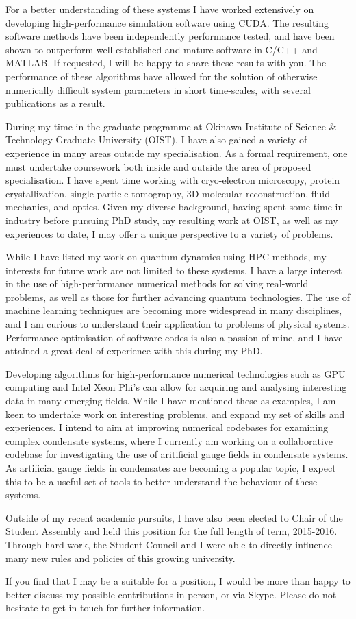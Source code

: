 \documentclass[12pt,a4paper,unicode]{moderncv}
\begin{document}
{    For a better understanding of these systems I have worked extensively on developing high-performance simulation software using CUDA. The resulting software methods have been independently performance tested, and have been shown to outperform well-established and mature software in C/C++ and \textsc{MATLAB}. If requested, I will be happy to share these results with you. The performance of these algorithms have allowed for the solution of otherwise numerically difficult system parameters in short time-scales, with several publications as a result.

    During my time in the graduate programme at Okinawa Institute of Science \& Technology Graduate University (OIST), I have also gained a variety of experience in many areas outside my specialisation. As a formal requirement, one must undertake coursework both inside and outside the area of proposed specialisation. I have spent time working with cryo-electron microscopy, protein crystallization, single particle tomography, 3D molecular reconstruction, fluid mechanics, and optics. Given my diverse background, having spent some time in industry before pursuing PhD study, my resulting work at OIST, as well as my experiences to date, I may offer a unique perspective to a variety of problems.

    While I have listed my work on quantum dynamics using HPC methods, my interests for future work are not limited to these systems. I have a large interest in the use of high-performance numerical methods for solving real-world problems, as well as those for further advancing quantum technologies. The use of machine learning techniques are becoming more widespread in many disciplines, and I am curious to understand their application to problems of physical systems. Performance optimisation of software codes is also a passion of mine, and I have attained a great deal of experience with this during my PhD.

    Developing algorithms for high-performance numerical technologies such as GPU computing and Intel Xeon Phi's can allow for acquiring and analysing interesting data in many emerging fields. While I have mentioned these as examples, I am keen to undertake work on interesting problems, and expand my set of skills and experiences. I intend to aim at improving numerical codebases for examining complex condensate systems, where I currently am working on a collaborative codebase for investigating the use of aritificial gauge fields in condensate systems. As artificial gauge fields in condensates are becoming a popular topic, I expect this to be a useful set of tools to better understand the behaviour of these systems.

    Outside of my recent academic pursuits, I have also been elected to Chair of the Student Assembly and held this position for the full length of term, 2015-2016. Through hard work, the Student Council and I were able to directly influence many new rules and policies of this growing university.

    If you find that I may be a suitable for a position, I would be more than happy to better discuss my possible contributions in person, or via Skype. Please do not hesitate to get in touch for further information.
}

\makeletterclosing
\end{document}
